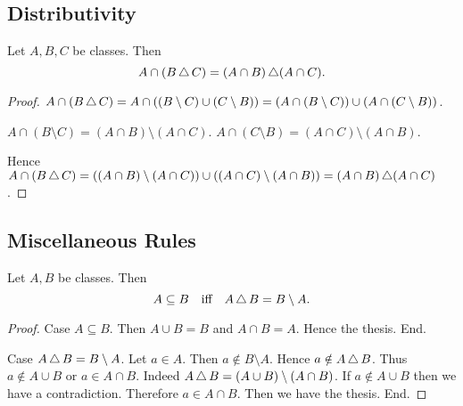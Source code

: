 \documentclass[10pt]{article}
\begin{document}
  \subsection{Distributivity}

  \begin{forthel}
    \begin{proposition}
      Let $A, B, C$ be classes.
      Then \[ A \cap (B \mathop{\triangle} C) = (A \cap B) \mathop{\triangle} (A \cap C). \]
    \end{proposition}
    \begin{proof}
      $A \cap (B \mathop{\triangle} C)
        = A \cap ((B \setminus C) \cup (C \setminus B))
        = (A \cap (B \setminus C)) \cup (A \cap (C \setminus B))$.

      $A \cap (B \setminus C) = (A \cap B) \setminus (A \cap C)$.
      $A \cap (C \setminus B) = (A \cap C) \setminus (A \cap B)$.

      Hence $A \cap (B \mathop{\triangle} C)
        = ((A \cap B) \setminus (A \cap C)) \cup ((A \cap C) \setminus (A \cap B))
        = (A \cap B) \mathop{\triangle} (A \cap C)$.
    \end{proof}
  \end{forthel}


  \subsection{Miscellaneous Rules}

  \begin{forthel}
    \begin{proposition}
      Let $A, B$ be classes.
      Then \[ A \subseteq B \quad \text{iff} \quad A \mathop{\triangle} B = B \setminus A. \]
    \end{proposition}
    \begin{proof}
      Case $A \subseteq B$.
        Then $A \cup B = B$ and $A \cap B = A$.
        Hence the thesis.
      End.

      Case $A \mathop{\triangle} B = B \setminus A$.
        Let $a \in A$.
        Then $a \notin B \setminus A$.
        Hence $a \notin A \mathop{\triangle} B$.
        Thus $a \notin A \cup B$ or $a \in A \cap B$.
        Indeed $A \mathop{\triangle} B = (A \cup B) \setminus (A \cap B)$.
        If $a \notin A \cup B$ then we have a contradiction.
        Therefore $a \in A \cap B$.
        Then we have the thesis.
      End.
    \end{proof}
  \end{forthel}
\end{document}
